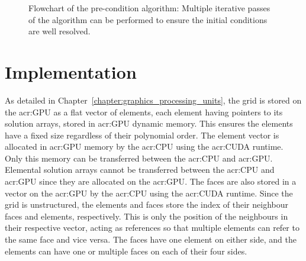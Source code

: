 \begin{figure}[H]
    \centering
    \caption{Flowchart of the pre-condition algorithm: Multiple iterative passes of the algorithm can be performed to ensure the initial conditions are well resolved.}\label{fig:pre-condition_flowchart}
\end{figure}



\section{Implementation}\label{section:adaptive_mesh_refinement:implementation}

As detailed in Chapter~\ref{chapter:graphics_processing_units}, the grid is stored on the
\acrshort{acr:GPU} as a flat vector of elements, each element having pointers to its solution
arrays, stored in \acrshort{acr:GPU} dynamic memory. This ensures the elements have a fixed size
regardless of their polynomial order. The element vector is allocated in \acrshort{acr:GPU} memory
by the \acrshort{acr:CPU} using the \acrshort{acr:CUDA} runtime. Only this memory can be transferred
between the \acrshort{acr:CPU} and \acrshort{acr:GPU}. Elemental solution arrays cannot be
transferred between the \acrshort{acr:CPU} and \acrshort{acr:GPU} since they are allocated on the
\acrshort{acr:GPU}. The faces are also stored in a vector on the \acrshort{acr:GPU} by the
\acrshort{acr:CPU} using the \acrshort{acr:CUDA} runtime. Since the grid is unstructured, the
elements and faces store the index of their neighbour faces and elements, respectively. This is only
the position of the neighbours in their respective vector, acting as references so that multiple
elements can refer to the same face and vice versa. The faces have one element on either side, and
the elements can have one or multiple faces on each of their four sides.

